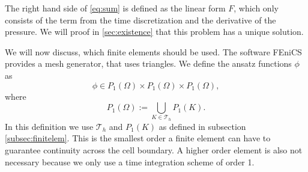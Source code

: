 \documentclass[12pt,a4paper,twoside, open=right]{scrreprt}
\theoremstyle{definition}
\theoremstyle{plain}
\begin{document}
The right hand side of \eqref{eq:sum} is defined as the linear form $F$, which only consists of the term from the time discretization and the derivative of the pressure. We will proof in \ref{sec:existence} that this problem has a unique solution. \par 
We will now discuss, which finite elements should be used. The software FEniCS provides a mesh generator, that uses triangles. We define the ansatz functions $\phi$ as
\begin{equation}
    \phi\in P_1(\Omega)\times P_1(\Omega)\times P_1(\Omega),
\end{equation}
where 
\begin{equation}
    P_1(\Omega):=\bigcup_{K\in\mathcal{T}_h}P_1(K).
\end{equation}
 In this definition we use $\mathcal{T}_h$ and $P_1(K)$ as defined in subsection \ref{subsec:finitelem}. This is the smallest order a finite element can have to guarantee continuity across the cell boundary. A higher order element is also not necessary because we only use a time integration scheme of order 1. 
\end{document}
